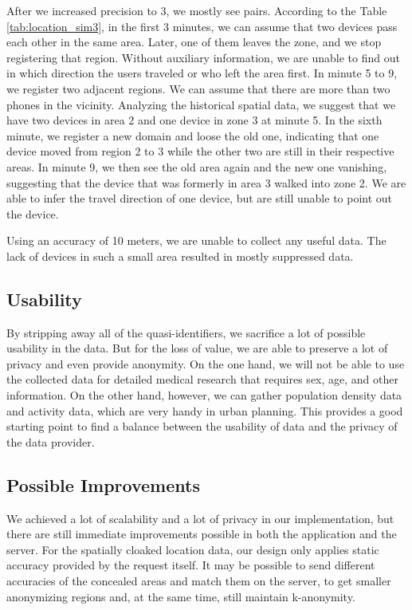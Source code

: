 After we increased precision to 3, we mostly see pairs. According to the Table \ref{tab:location_sim3}, in the first 3 minutes, we can assume that two devices pass each other in the same area. Later, one of them leaves the zone, and we stop registering that region. Without auxiliary information, we are unable to find out in which direction the users traveled or who left the area first. In minute 5 to 9, we register two adjacent regions. We can assume that there are more than two phones in the vicinity. Analyzing the historical spatial data, we suggest that we have two devices in area 2 and one device in zone 3 at minute 5. In the sixth minute, we register a new domain and loose the old one, indicating that one device moved from region 2 to 3 while the other two are still in their respective areas. In minute 9, we then see the old area again and the new one vanishing, suggesting that the device that was formerly in area 3 walked into zone 2. We are able to infer the travel direction of one device, but are still unable to point out the device.

Using an accuracy of 10 meters, we are unable to collect any useful data. The lack of devices in such a small area resulted in mostly suppressed data.  

\subsection{Usability}
By stripping away all of the quasi-identifiers, we sacrifice a lot of possible usability in the data. But for the loss of value, we are able to preserve a lot of privacy and even provide anonymity. On the one hand, we will not be able to use the collected data for detailed medical research that requires sex, age, and other information. On the other hand, however, we can gather population density data and activity data, which are very handy in urban planning. This provides a good starting point to find a balance between the usability of data and the privacy of the data provider.

\subsection{Possible Improvements}
We achieved a lot of scalability and a lot of privacy in our implementation, but there are still immediate improvements possible in both the application and the server. For the spatially cloaked location data, our design only applies static accuracy provided by the request itself. It may be possible to send different accuracies of the concealed areas and match them on the server, to get smaller anonymizing regions and, at the same time, still maintain k-anonymity.


